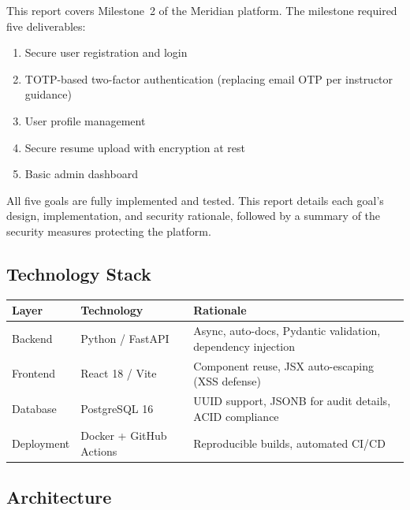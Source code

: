\documentclass[12pt, a4paper]{article}
\begin{document}
This report covers Milestone~2 of the Meridian platform. The milestone required five deliverables:

\begin{enumerate}
    \item Secure user registration and login
    \item TOTP-based two-factor authentication (replacing email OTP per instructor guidance)
    \item User profile management
    \item Secure resume upload with encryption at rest
    \item Basic admin dashboard
\end{enumerate}

All five goals are fully implemented and tested. This report details each goal's design, implementation, and security rationale, followed by a summary of the security measures protecting the platform.

\subsection{Technology Stack}

\begin{table}[H]
\centering
\small
\begin{tabular}{p{3cm} p{4cm} p{6cm}}
    \toprule
    \textbf{Layer} & \textbf{Technology} & \textbf{Rationale} \\
    \midrule
    Backend & Python / FastAPI & Async, auto-docs, Pydantic validation, dependency injection \\
    Frontend & React 18 / Vite & Component reuse, JSX auto-escaping (XSS defense) \\
    Database & PostgreSQL 16 & UUID support, JSONB for audit details, ACID compliance \\
    Deployment & Docker + GitHub Actions & Reproducible builds, automated CI/CD \\
    \bottomrule
\end{tabular}
\end{table}

\subsection{Architecture}
\end{document}
